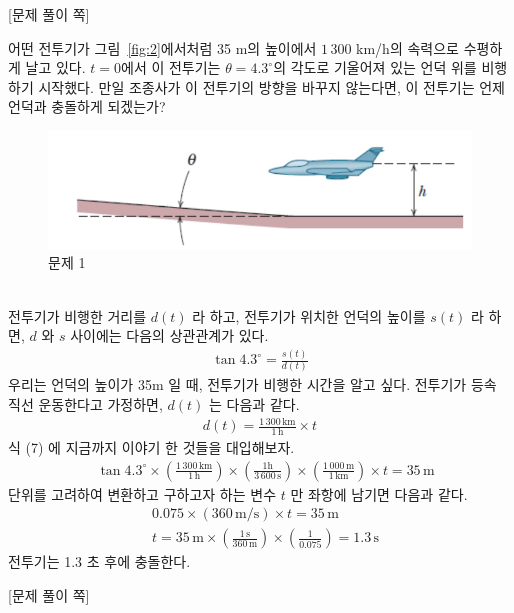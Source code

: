 \documentclass[APS,floatfix,nofootinbib,superscriptaddress,fleqn,preprint]{revtex4}
\begin{document}
{\color{gray} [문제 풀이 쪽]}

\newpage 

어떤 전투기가 그림~\ref{fig:2}에서처럼
35 m의 높이에서 $1\,300$ km/h의 속력으로 수평하게 날고 있다. $t=0$에서
이 전투기는 $\theta=4.3^\circ$의 각도로 기울어져 있는 언덕 위를
비행하기 시작했다. 만일 조종사가 이 전투기의 방향을 바꾸지 않는다면,
이 전투기는 언제 언덕과 충돌하게 되겠는가? 
\begin{figure}[ht]
  \centering
\includegraphics[scale=1.0]{Qfig3-2.pdf}  
  \caption{문제 1}
  \label{fig:1}
\end{figure} \\
전투기가 비행한 거리를 $d(t)$ 라 하고, 전투기가 위치한 언덕의 높이를 $s(t)$ 라 하면, $d$ 와 $s$ 사이에는 다음의 상관관계가 있다.
\begin{align}
  \tan{4.3^\circ} =\frac{s(t)}{d(t)} 
\end{align}
우리는 언덕의 높이가 35m 일 때, 전투기가 비행한 시간을 알고 싶다. 전투기가 등속 직선 운동한다고 가정하면, $d(t)$ 는 다음과 같다.
\begin{align}
  d(t) = \frac{1\,300\,\mathrm{km}}{1\,\mathrm{h}}\times t
\end{align}
식 (7) 에 지금까지 이야기 한 것들을 대입해보자.
\begin{align}
  &\tan{4.3^\circ} \times \left(\frac{1\,300\,\mathrm{km}}{1\,\mathrm{h}}\right) \times \left(\frac{1\mathrm{h}}{3\,600\,\mathrm{s}}\right) \times \left(\frac{1\,000\,\mathrm{m}}{1\,\mathrm{km}}\right) \times t = 35\,\mathrm{m}
\end{align}
단위를 고려하여 변환하고 구하고자 하는 변수 $t$ 만 좌항에 남기면 다음과 같다.
\begin{align}    
  &0.075\times (360\,\mathrm{m/s})\times t = 35\,\mathrm{m} \\
  &t=35\,\mathrm{m}\times\left(\frac{1\,\mathrm{s}}{360\,\mathrm{m}}\right) \times \left(\frac{1}{0.075}\right) = 1.3\,\mathrm{s}
\end{align}
전투기는 1.3 초 후에 충돌한다.
\newpage

{\color{gray} [문제 풀이 쪽]}
\end{document}
